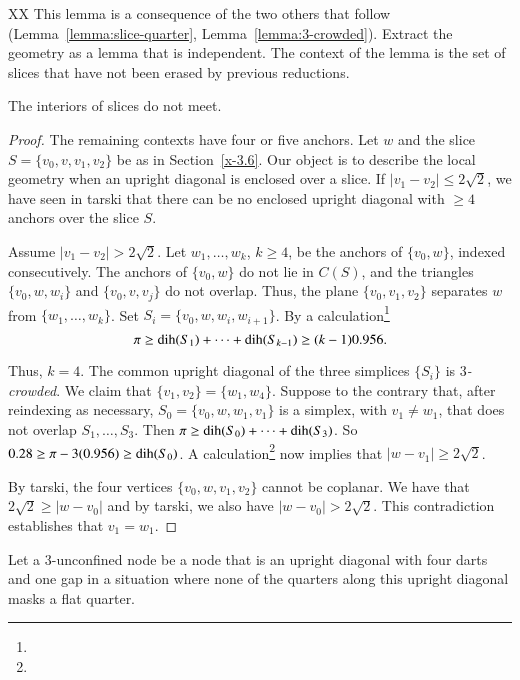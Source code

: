 XX
This lemma is a consequence of the two others that follow
(Lemma~\ref{lemma:slice-quarter}, Lemma~\ref{lemma:3-crowded}).
Extract the geometry as a lemma that is independent.
The
context of the lemma is the set of slices that have
not been erased by previous reductions.

\begin{lemma}
The interiors of slices do not meet.
\end{lemma}

\begin{proof}
The remaining contexts have four or  five anchors. Let $w$ and the
slice $S=\{v_0,v,v_1,v_2\}$ be as in Section~\ref{x-3.6}.
Our object is to describe the local geometry when an upright
diagonal is enclosed over a slice. If $|v_1-v_2|\le
2\sqrt{2}$, we have seen in tarski that
there can be no enclosed upright diagonal with $\ge 4$ anchors
over the slice $S$.

Assume  $|v_1-v_2|>2\sqrt{2}$. Let $w_1,\ldots,w_k$, $k\ge4$, be the
anchors of $\{v_0,w\}$, indexed consecutively. The anchors of $\{v_0,w\}$ do not
lie in $C(S)$, and the triangles $\{v_0,w,w_i\}$ and $\{v_0,v,v_j\}$ do not
overlap. Thus, the plane $\{v_0,v_1,v_2\}$ separates $w$ from
$\{w_1,\ldots,w_k\}$. Set $S_i=\{v_0,w,w_i,w_{i+1}\}$.
By a calculation\footnote{} %
    $$\pi\ge \operatorname{dih}(S_1)+\cdots+\operatorname{dih}(S_{k-1})\ge (k-1)0.956.$$

Thus, $k=4$. The common upright diagonal  of the three simplices
$\{S_i\}$ is {\it $3$-crowded}.  We claim that
$\{v_1,v_2\}=\{w_1,w_4\}$. Suppose to the contrary that, after
reindexing as necessary, $S_0=\{v_0,w,w_1,v_1\}$ is a simplex, with
$v_1\ne w_1$, that does not overlap $S_1,\ldots,S_3$. Then $\pi\ge
\operatorname{dih}(S_0)+\cdots+\operatorname{dih}(S_3)$. So
    $0.28\ge \pi-3(0.956)\ge \operatorname{dih}(S_0)$.
A calculation\footnote{} %
now implies that $|w-v_1|\ge 2\sqrt{2}$.

By tarski, the four vertices
$\{v_0,w,v_1,v_2\}$ cannot be coplanar.
We have that $2\sqrt{2}\ge|w-v_0|$ and by tarski,
we also have $|w-v_0|>2\sqrt2$.
This contradiction establishes that $v_1=w_1$.
\end{proof}


\begin{definition}
Let a $3$-unconfined node be a node that is an upright diagonal 
with four darts and one gap in a situation where none of
the quarters along this upright diagonal masks a flat quarter.
\end{definition}








